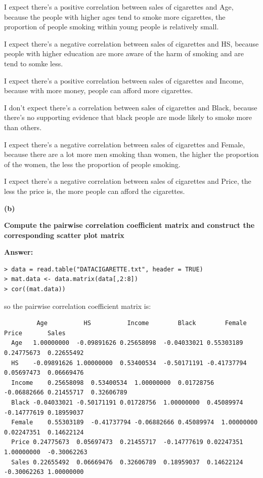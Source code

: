 \documentclass[letterpaper,11pt]{article}
\begin{document}
I expect there's a positive correlation between sales of cigarettes and Age, because the people with higher ages tend to smoke more cigarettes, the proportion of people smoking within young people is relatively small.\par
I expect there's a negative correlation between sales of cigarettes and HS, because people with higher education are more aware of the harm of smoking and are tend to somke less.\par
I expect there's a positive correlation between sales of cigarettes and Income, because with more money, people can afford more cigarettes.\par
I don't expect there's a correlation between sales of cigarettes and Black, because there's no supporting evidence that black people are mode likely to smoke more than others.\par
I expect there's a negative correlation between sales of cigarettes and Female, because there are a lot more men smoking than women, the higher the proportion of the women, the less the proportion of people smoking.\par
I expect there's a negative correlation between sales of cigarettes and Price, the less the price is, the more people can afford the cigarettes.\par


\begin{addmargin}[-1.1em]{0em}
  \textbf{(b)}\par
\end{addmargin}
\textbf{Compute the pairwise correlation coefficient matrix and construct the corresponding scatter plot matrix}\par
\bigbreak
\begin{addmargin}[-0.5em]{0em}
  \textbf{Answer: }
\end{addmargin}

\begin{lstlisting}
> data = read.table("DATACIGARETTE.txt", header = TRUE)
> mat.data <- data.matrix(data[,2:8])
> cor((mat.data))
\end{lstlisting}
so the pairwise correlation coefficient matrix is:
\begin{lstlisting}
         Age	      HS	      Income	    Black	     Female	    Price	    Sales
  Age	1.00000000	-0.09891626	0.25658098	-0.04033021	0.55303189	0.24775673	0.22655492
  HS	-0.09891626	1.00000000	0.53400534	-0.50171191	-0.41737794	0.05697473	0.06669476
  Income	0.25658098	0.53400534	1.00000000	0.01728756	-0.06882666	0.21455717	0.32606789
  Black	-0.04033021	-0.50171191	0.01728756	1.00000000	0.45089974	-0.14777619	0.18959037
  Female	0.55303189	-0.41737794	-0.06882666	0.45089974	1.00000000	0.02247351	0.14622124
  Price	0.24775673	0.05697473	0.21455717	-0.14777619	0.02247351	1.00000000	-0.30062263
  Sales	0.22655492	0.06669476	0.32606789	0.18959037	0.14622124	-0.30062263	1.00000000
\end{lstlisting}
\end{document}
